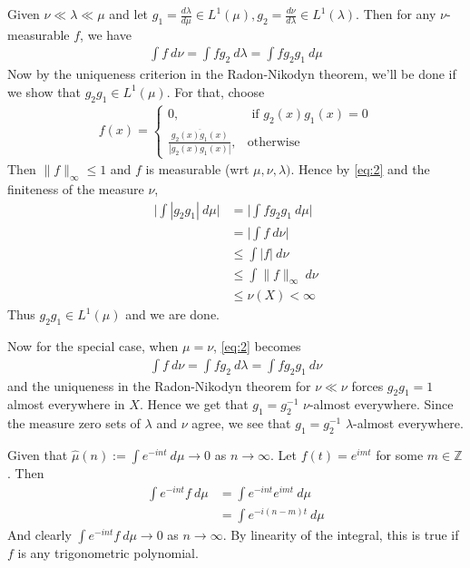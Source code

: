 \documentclass[12pt]{exam}
\theoremstyle{plain} %
\theoremstyle{definition} %
\theoremstyle{remark} %
\begin{document}
\begin{questions}
  \question
  \begin{solution}
    Given $\nu \ll \lambda \ll \mu$ and let $g_1 = \frac{ d \lambda}{d  \mu}
    \in L^{1}(\mu), g_2 = \frac{ d
    \nu}{d \lambda} \in L^{1}(\lambda)$. Then for any
    $\nu$-measurable $f$, we have
    \begin{align}
      \label{eq:2}
      \int f \ d  \nu= \int f g_2 \ d  \lambda  = \int f g_2 g_1 \ d  \mu
    \end{align}
    Now by the uniqueness criterion in the Radon-Nikodyn theorem,
    we'll be done if we show that $g_2g_1 \in L^{1}(\mu)$. For that, choose
    \begin{align*}
      f(x) =
      \begin{cases}
        0, & \textrm{ if } g_2(x)g_1(x) = 0 \\
        \frac{\overline{g_2(x)g_1(x)}}{|g_2(x)g_1(x)|}, & \textrm{otherwise}
      \end{cases}
    \end{align*}
    Then $\|f\|_\infty \le 1$ and $f$ is measurable (wrt $\mu, \nu,
    \lambda)$. Hence by \autoref{eq:2} and the finiteness of the measure $\nu$,
    \begin{align*}
      \Big| \int |g_2 g_1| \ d \mu \Big |&= \Big |\int f g_2 g_1 \ d
      \mu \Big |\\
      &= \Big | \int f \ d \nu \Big |\\
      &\le \int |f| \ d \nu \\
      &\le  \int \|f\|_\infty \ d  \nu \\
      &\le \nu(X) < \infty
    \end{align*}
    Thus $g_2g_1 \in L^{1}(\mu)$ and we are done.

    Now for the special case, when $\mu = \nu$, \autoref{eq:2} becomes
    \begin{align*}
      \int f \ d  \nu= \int f g_2 \ d  \lambda  = \int f g_2 g_1 \ d  \nu
    \end{align*}
    and the uniqueness in the Radon-Nikodyn theorem for $\nu \ll \nu$
    forces $g_2g_1 = 1$ almost everywhere in $X$. Hence we get that
    $g_1 = g_2^{-1}$ $\nu$-almost everywhere.  Since the
    measure zero sets of $\lambda$ and $\nu$ agree, we see that $g_1
    = g_2^{-1}$ $\lambda$-almost everywhere.
  \end{solution}

  \question
  \begin{solution}
    Given that $\hat{\mu}(n) := \int e^{-int} \ d \mu \to 0$ as $n
    \to \infty$. Let $f(t) = e^{imt}$ for some $m \in \mathbb{Z}$. Then
    \begin{align*}
      \int e^{-int} f \ d \mu &= \int  e^{-int} e^{ imt} \ d \mu \\
      &= \int  e^{-i (n - m) t} \ d \mu
    \end{align*}
    And clearly $\int e^{-int} f \ d \mu \to 0$ as $n \to \infty$. By
    linearity of the integral, this is true if $f$ is any
    trigonometric polynomial.


\end{solution}
\end{questions}
\end{document}
